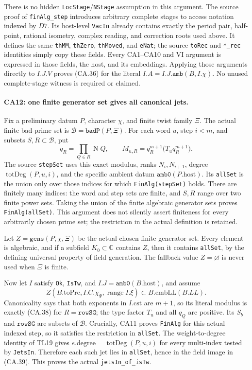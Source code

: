 There is no hidden \texttt{LocStage}/\texttt{NStage} assumption
in this argument. The source proof of \texttt{finAlg\_step}
introduces arbitrary complete stages to access notation indexed
by $D7$. Its host-level \texttt{VacIn} already contains exactly
the period pair, half-point, rational isometry, complex reading,
and correction roots used above. It defines the same
\texttt{thMM}, \texttt{thZero}, \texttt{thMoved}, and
\texttt{eNat}; the source \texttt{toRec} and \texttt{*\_rec}
identities simply copy these fields. Every CA1--CA10 and VI
argument is expressed in those fields, the host, and its
embeddings. Applying those arguments directly to $I.J.V$ proves
(CA.36) for the literal $I.A=I.J.\texttt{amb}(B,I.\chi)$.
No unused complete-stage witness is required or claimed.

\paragraph{CA12: one finite generator set gives all canonical jets.}
Fix a preliminary datum $P$, character $\chi$, and finite twist
family $\Xi$. The actual finite bad-prime set is
$\mathcal B=\texttt{badP}(P,\Xi)$. For each word $u$, step
$i<m$, and subsets $S,R\subset\mathcal B$, put
\[
 q_R=\prod_{Q\in R}\operatorname NQ,\qquad
 M_{u,R}=q_R^{m+1}\bigl(T_uq_R^{m+1}\bigr).
 \tag{CA.38}
\]
The source \texttt{stepSet} uses this exact modulus, ranks
$N_i,N_{i+1}$, degree $\operatorname{totDeg}(P,u,i)$, and the
specific ambient datum $\texttt{amb0}(P.\mathrm{host})$.
Its \texttt{allSet} is the union only over those indices for
which \texttt{FinAlg(stepSet)} holds. There are finitely many
indices: the word and step sets are finite, and $S,R$ range over
two finite power sets. Taking the union of the finite algebraic
generator sets proves \texttt{FinAlg(allSet)}. This argument
does not silently assert finiteness for every arbitrarily chosen
prime set; the restriction in the actual definition is retained.

Let $Z=\texttt{gens}(P,\chi,\Xi)$ be the actual chosen finite
generator set. Every element is algebraic, and if a subfield
$K_0\subset\mathbb C$ contains $Z$, then it contains
\texttt{allSet}, by the defining universal property of field
generation. The fallback value $Z=\varnothing$ is never used
when $\Xi$ is finite.

Now let $I$ satisfy \texttt{Ok}, \texttt{IsTw}, and
$I.J=\texttt{amb0}(B.\mathrm{host})$, and assume
\[
 Z(B.\mathrm{toPre},I.C.\chi_\Psi,\operatorname{range}I.\xi)
                   \subset B.\mathrm{embLL}(B.LL).
 \tag{CA.39}
\]
Canonicality says that both exponents in $I.\mathrm{cst}$
are $m+1$, so its literal modulus is exactly (CA.38) for
$R=\texttt{rowSG}$; the type factor $T_u$ and all $q_Q$ are
positive. Its $S_b$ and $\texttt{rowSG}$ are subsets of
$\mathcal B$. Crucially, CA11 proves \texttt{FinAlg} for this
actual indexed step, so it satisfies the restriction in
\texttt{allSet}. The weight-to-degree identity of TL19 gives
$e.\mathrm{degree}=\operatorname{totDeg}(P,u,i)$ for every
multi-index tested by \texttt{JetsIn}. Therefore each such jet
lies in \texttt{allSet}, hence in the field image in (CA.39).
This proves the actual \texttt{jetsIn\_of\_isTw}.

